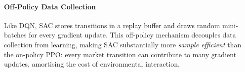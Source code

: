 \paragraph{Off-Policy Data Collection}
Like DQN, SAC stores transitions in a replay buffer and draws random mini-batches for every gradient update. This off-policy mechanism decouples data collection from learning, making SAC substantially more \textit{sample efficient} than the on-policy PPO: every market transition can contribute to many gradient updates, amortising the cost of environmental interaction.
